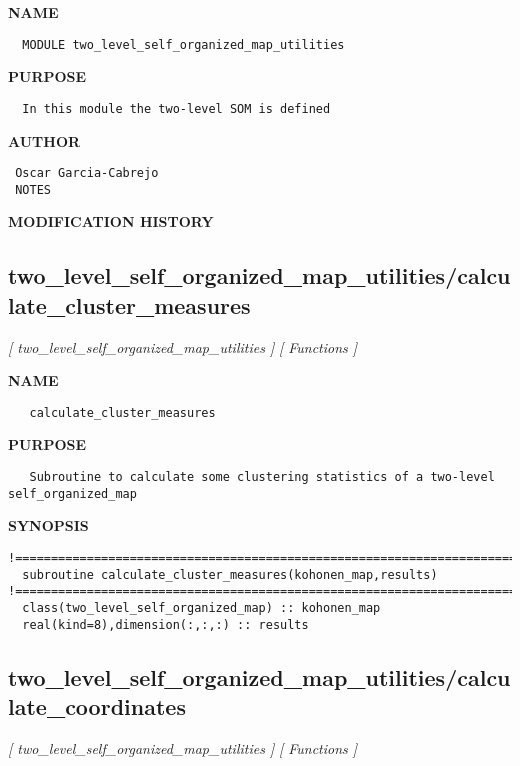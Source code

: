 \documentclass{article}
\begin{document}
\label{ch:robo8}
\label{ch:Kohonen_two_level_self_organized_map_utilities}
\textbf{NAME}
\begin{verbatim}
  MODULE two_level_self_organized_map_utilities
\end{verbatim}
\textbf{PURPOSE}
\begin{verbatim}
  In this module the two-level SOM is defined 
\end{verbatim}
\textbf{AUTHOR}
\begin{verbatim}
 Oscar Garcia-Cabrejo
 NOTES 
\end{verbatim}
\textbf{MODIFICATION HISTORY}
\newpage
\subsection{two\_level\_self\_organized\_map\_utilities/calculate\_cluster\_measures}
\textsl{[ two\_level\_self\_organized\_map\_utilities ]}
\textsl{[ Functions ]}

\label{ch:robo61}
\label{ch:two_level_self_organized_map_utilities_calculate_cluster_measures}
\textbf{NAME}
\begin{verbatim}
   calculate_cluster_measures
\end{verbatim}
\textbf{PURPOSE}
\begin{verbatim}
   Subroutine to calculate some clustering statistics of a two-level self_organized_map 
\end{verbatim}
\textbf{SYNOPSIS}
\begin{verbatim}
!========================================================================================
  subroutine calculate_cluster_measures(kohonen_map,results)
!========================================================================================
  class(two_level_self_organized_map) :: kohonen_map
  real(kind=8),dimension(:,:,:) :: results
\end{verbatim}
\newpage
\subsection{two\_level\_self\_organized\_map\_utilities/calculate\_coordinates}
\textsl{[ two\_level\_self\_organized\_map\_utilities ]}
\textsl{[ Functions ]}
\end{document}
